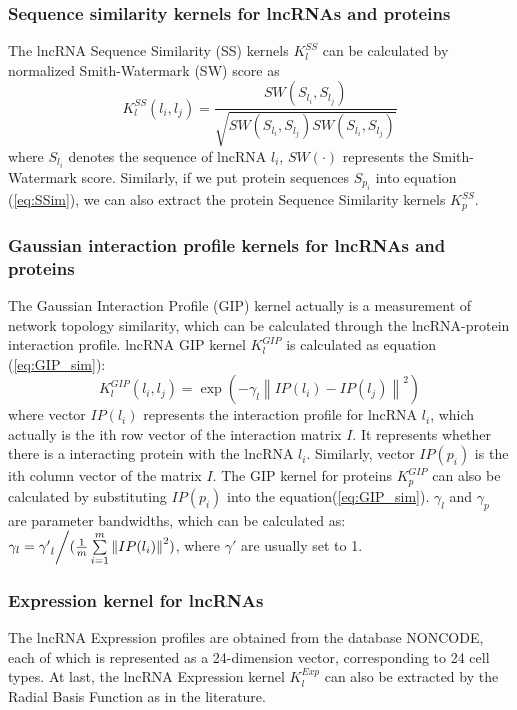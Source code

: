 \documentclass[fleqn,10pt]{wlscirep}
\begin{document}
\subsubsection*{Sequence similarity kernels for lncRNAs and proteins}
The lncRNA Sequence Similarity (SS) kernels ${{K}}_l^{SS}$ can be calculated by normalized Smith-Watermark (SW) score as\cite{Shen2019}
\begin{equation}
{{K}}_l^{SS}({l_i},{l_j}) = \frac{{SW({S_{{l_i}}},{S_{{l_j}}})}}{{\sqrt {SW({S_{{l_i}}},{S_{{l_j}}})SW({S_{{l_i}}},{S_{{l_j}}})} }} \label{eq:SSim}
\end{equation}
where ${{S_{{l_i}}}}$ denotes the sequence of lncRNA ${l_i}$, $SW( \cdot )$ represents the Smith-Watermark score. Similarly, if we put protein sequences ${{S_{{p_i}}}}$ into equation (\ref{eq:SSim}), we can also extract the protein Sequence Similarity kernels ${{K}}_p^{SS}$.

\subsubsection*{Gaussian interaction profile kernels for lncRNAs and proteins}
The Gaussian Interaction Profile (GIP) kernel actually is a measurement of network topology similarity\cite{VanLaarhoven2011}, which can be calculated through the lncRNA-protein interaction profile. lncRNA GIP kernel ${{K}}_l^{GIP}$ is calculated as equation (\ref{eq:GIP_sim}):
\begin{equation} \label{eq:GIP_sim}
{{K}}_l^{GIP}({l_i},{l_j}) = \exp ( - {\gamma _l}{\left\| {{IP}({l_i}) - {IP}({l_j})} \right\|^2})
\end{equation}
where vector ${{{IP}}({l_i})}$ represents the interaction profile for lncRNA $l_i$, which actually is the ith row vector of the interaction matrix ${{I}}$. It represents whether there is a interacting protein with the lncRNA $l_i$. Similarly, vector ${{{IP}}({p_i})}$ is the ith column vector of the matrix ${{I}}$. The GIP kernel for proteins ${{K}}_p^{GIP}$ can also be calculated by substituting ${{{IP}}({p_i})}$ into the equation(\ref{eq:GIP_sim}).
   ${\gamma _l}$ and ${\gamma _p}$ are parameter bandwidths, which can be calculated as: ${\gamma _l} = {{{{\gamma '}_l}} \mathord{\left/
 {\vphantom {{{{\gamma '}_l}} {(\frac{1}{m}\sum\limits_{i = 1}^m {{{\left\| {{{IP}}({l_i})} \right\|}^2}} )}}} \right.
 \kern-\nulldelimiterspace} {(\frac{1}{m}\sum\limits_{i = 1}^m {{{\left\| {{IP}({l_i})} \right\|}^2}} )}}$, where ${\gamma '}$ are usually set to 1.

\subsubsection*{Expression kernel for lncRNAs}
The lncRNA Expression profiles are obtained from the database NONCODE, each of which is represented as a 24-dimension vector, corresponding to 24 cell types. At last, the lncRNA Expression kernel ${{K}}_l^{Exp}$ can also be extracted by the Radial Basis Function as in the literature\cite{Buhmann2004}.
\end{document}
